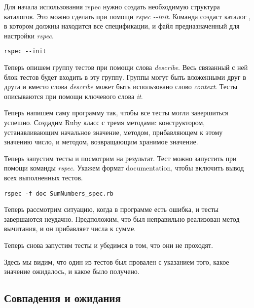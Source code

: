 Для начала использования rspec нужно создать необходимую структура каталогов. Это можно сделать при помощи \emph{rspec -{}-init}. Команда создаст каталог , в котором должны находится все спецификации, и файл  предназначенный для настройки \emph{rspec}.

\begin{verbatim}
rspec --init
\end{verbatim}

Теперь опишем группу тестов при помощи слова \emph{describe}. Весь связанный с ней блок тестов будет входить в эту группу. Группы могут быть вложенными друг в друга и вместо слова \emph{describe} может быть использовано слово \emph{context}. Тесты описываются при помощи ключевого слова \emph{it}.



Теперь напишем саму программу так, чтобы все тесты могли завершиться успешно. Создадим Ruby класс с тремя методами: конструктором, устанавливающим начальное значение, методом, прибавляющем к этому значению число, и методом, возвращающим хранимое значение.



Теперь запустим тесты и посмотрим на результат. Тест можно запустить при помощи команды \emph{rspec}. Укажем формат documentation, чтобы включить вывод всех выполненных тестов.

\begin{verbatim}
rspec -f doc SumNumbers_spec.rb
\end{verbatim}


Теперь рассмотрим ситуацию, когда в программе есть ошибка, и тесты завершаются неудачно. Предположим, что был неправильно реализован метод вычитания, и он прибавляет числа к сумме.



Теперь снова запустим тесты и убедимся в том, что они не проходят.


Здесь мы видим, что один из тестов был провален с указанием того, какое значение ожидалось, и какое было получено.

\subsection{Совпадения и ожидания}

